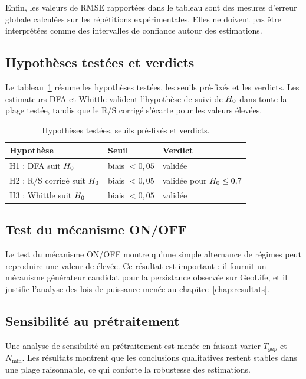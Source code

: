Enfin, les valeurs de RMSE rapportées dans le tableau sont des
mesures d'erreur globale calculées sur les répétitions
expérimentales. Elles ne doivent pas être interprétées comme
des intervalles de confiance autour des estimations.

\subsection{Hypothèses testées et verdicts}
Le tableau~\ref{tab:hypotheses} résume les hypothèses testées, les seuils pré-fixés et les verdicts. Les estimateurs DFA et Whittle valident l'hypothèse de suivi de $H_0$ dans toute la plage testée, tandis que le R/S corrigé s'écarte pour les valeurs élevées.

\begin{table}[H]
\centering
\caption{Hypothèses testées, seuils pré-fixés et verdicts.}
\label{tab:hypotheses}
\begin{tabular}{lll}
\toprule
Hypothèse & Seuil & Verdict \\
\midrule
H1 : DFA suit $H_0$ & biais $< 0{,}05$ & validée \\
H2 : R/S corrigé suit $H_0$ & biais $< 0{,}05$ & validée pour $H_0 \le 0{,}7$ \\
H3 : Whittle suit $H_0$ & biais $< 0{,}05$ & validée \\
\bottomrule
\end{tabular}
\end{table}

\subsection{Test du mécanisme ON/OFF}
Le test du mécanisme ON/OFF montre qu'une simple alternance de régimes peut reproduire une valeur de \Hurst{} élevée. Ce résultat est important : il fournit un mécanisme générateur candidat pour la persistance observée sur GeoLife, et il justifie l'analyse des lois de puissance menée au chapitre~\ref{chap:resultats}.

\subsection{Sensibilité au prétraitement}
Une analyse de sensibilité au prétraitement est menée en faisant varier $T_{gap}$ et $N_{\min}$. Les résultats montrent que les conclusions qualitatives restent stables dans une plage raisonnable, ce qui conforte la robustesse des estimations.

